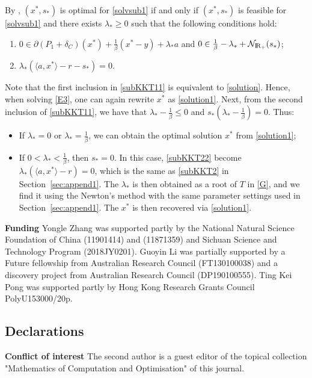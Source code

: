 \documentclass[10pt]{article}
\numberwithin{equation}{section}
\def\R{{\rm I\!R}}
\begin{document}
By \cite[Corollary~28.2.1, Theorem~28.3]{Ro70}, $(x^*, s_*)$ is optimal for \eqref{solvsub1} if and only if $(x^*, s_*)$ is feasible for \eqref{solvsub1} and there exists $\lambda_*\ge 0$ such that the following conditions hold:
\begin{enumerate}[{\rm (A)}]
  \item\label{subKKT11}  $0\in\partial (P_1 + \delta_{C})(x^*) + \frac{1}{\beta}(x^* - y) + \lambda_*a $ and $0\in \frac{1}{\beta} - \lambda_* + \mathcal{N}_{\R_+}(s_*)$;
  \item\label{subKKT22}  $\lambda_*(\langle a, x^*\rangle - r - s_*)=0$.
\end{enumerate}
Note that the first inclusion in \eqref{subKKT11} is equivalent to \eqref{solution}. Hence, when solving \eqref{E3}, one can again rewrite $x^*$ as \eqref{solution1}. Next, from the second inclusion of \eqref{subKKT11}, we have that $\lambda_* - \frac{1}{\beta} \leq 0$ and $s_*(\lambda_* - \frac{1}{\beta}) = 0$. Thus:
\begin{itemize}
  \item If $\lambda_* = 0$ or $\lambda_* = \frac{1}{\beta}$, {\color{black} we }can obtain the optimal solution $x^*$ from \eqref{solution1};
  \item If $0< \lambda_* < \frac{1}{\beta}$, then $s_* = 0$. In this case, \eqref{subKKT22} become $\lambda_*(\langle a, x^*\rangle - r)=0$, which is the same as \eqref{subKKT2} in Section~\ref{sec:append1}. The $\lambda_*$ is then obtained as a root of $T$ in \eqref{G}, and we find it using the Newton's method with the same parameter settings used in Section~\ref{sec:append1}. The $x^*$ is then recovered via \eqref{solution1}.
\end{itemize}

{\color{black}
\textbf{Funding} Yongle Zhang was supported partly by the National Natural Science Foundation of China (11901414) and (11871359) and Sichuan Science and Technology Program (2018JY0201). Guoyin Li was partially supported by a Future fellowship from Australian Research Council (FT130100038) and a discovery project from Australian Research Council (DP190100555). Ting Kei Pong was supported partly by Hong Kong Research Grants Council PolyU153000/20p.

\subsection*{Declarations}
\textbf{Conflict of interest} The second author is a guest editor of the topical collection "Mathematics of Computation and Optimisation" of this journal. }
\end{document}
